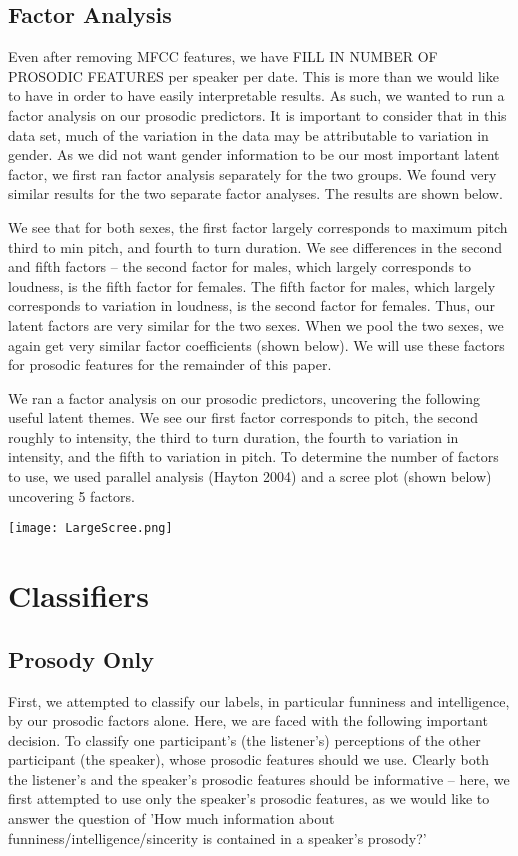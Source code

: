 \documentclass[11pt]{article}
\begin{document}
\subsection{Factor Analysis}
Even after removing MFCC features, we have FILL IN NUMBER OF PROSODIC FEATURES per speaker per date.  This is more than we would like to have in order to have easily interpretable results.  As such, we wanted to run a factor analysis on our prosodic predictors.  It is important to consider that in this data set, much of the variation in the data may be attributable to variation in gender.  As we did not want gender information to be our most important latent factor, we first ran factor analysis separately for the two groups.  We found very similar results for the two separate factor analyses.  The results are shown below.

We see that for both sexes, the first factor largely corresponds to maximum pitch third to min pitch, and fourth to turn duration.  We see differences in the second and fifth factors -- the second factor for males, which largely corresponds to loudness, is the fifth factor for females.  The fifth factor for males, which largely corresponds to variation in loudness, is the second factor for females.  Thus, our latent factors are very similar for the two sexes.  When we pool the two sexes, we again get very similar factor coefficients (shown below).  We will use these factors for prosodic features for the remainder of this paper.


We ran a factor analysis on our prosodic predictors, uncovering the following useful latent themes.  We see our first factor corresponds to pitch, the second roughly to intensity, the third to turn duration, the fourth to variation in intensity, and the fifth to variation in pitch. To determine the number of factors to use, we used parallel analysis (Hayton 2004) and a scree plot (shown below) uncovering 5 factors.

\begin{center}
\texttt{[image: LargeScree.png]}
\end{center}

\section{Classifiers}
\subsection{Prosody Only}
First, we attempted to classify our labels, in particular funniness and intelligence, by our prosodic factors alone.  Here, we are faced with the following important decision.  To classify one participant's (the listener's) perceptions of the other participant (the speaker), whose prosodic features should we use.  Clearly both the listener's and the speaker's prosodic features should be informative -- here, we first attempted to use only the speaker's prosodic features, as we would like to answer the question of 'How much information about funniness/intelligence/sincerity is contained in a speaker's prosody?'
\end{document}
